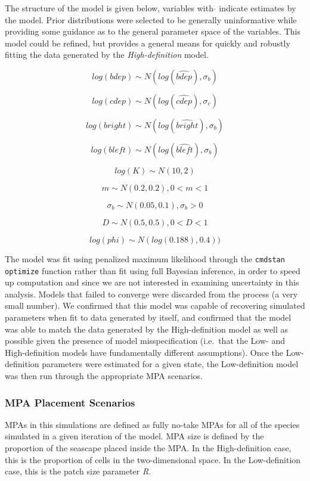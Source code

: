 \documentclass[
  default,
  lineno,
  referee]{sn-jnl}
\begin{document}
The structure of the model is given below, variables with \(\hat{}\)
indicate estimates by the model. Prior distributions were selected to be
generally uninformative while providing some guidance as to the general
parameter space of the variables. This model could be refined, but
provides a general means for quickly and robustly fitting the data
generated by the \emph{High-definition} model.

\[
log(bdep) \sim N(log(\hat{bdep}),\sigma_b)
\]

\[
log(cdep) \sim N(log(\hat{cdep}),\sigma_c)
\]

\[
log(bright) \sim N(log(\hat{bright}),\sigma_b)
\]

\[
log(bleft) \sim N(log(\hat{bleft}),\sigma_b)
\]

\[
log(K) \sim N(10,2)
\]

\[
m \sim N(0.2,0.2), 0 < m < 1
\]

\[
\sigma_b \sim N(0.05,0.1), \sigma_b > 0
\]

\[
D \sim N(0.5,0.5) ,0 < D < 1
\]

\[
log(phi) \sim N(log(0.188),0.4))
\]

The model was fit using penalized maximum likelihood through the
\texttt{cmdstan} \texttt{optimize} function rather than fit using full
Bayesian inference, in order to speed up computation and since we are
not interested in examining uncertainty in this analysis. Models that
failed to converge were discarded from the process (a very small
number). We confirmed that this model was capable of recovering
simulated parameters when fit to data generated by itself, and confirmed
that the model was able to match the data generated by the
High-definition model as well as possible given the presence of model
misspecification (i.e.~that the Low- and High-definition models have
fundamentally different assumptions). Once the Low-definition parameters
were estimated for a given state, the Low-definition model was then run
through the appropriate MPA scenarios.

\subsubsection{MPA Placement Scenarios}\label{mpa-placement-scenarios}

MPAs in this simulations are defined as fully no-take MPAs for all of
the species simulated in a given iteration of the model. MPA size is
defined by the proportion of the seascape placed inside the MPA. In the
High-definition case, this is the proportion of cells in the
two-dimensional space. In the Low-definition case, this is the patch
size parameter \emph{R}.
\end{document}
